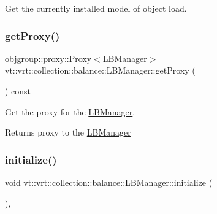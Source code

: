 Get the currently installed model of object load. 

\mbox{\label{structvt_1_1vrt_1_1collection_1_1balance_1_1_l_b_manager_aa0fbba6d90873e5fa6e40767efcabb5c}} 
\subsubsection{\texorpdfstring{get\+Proxy()}{getProxy()}}
{\footnotesize\ttfamily \hyperlink{structvt_1_1objgroup_1_1proxy_1_1_proxy}{objgroup\+::proxy\+::\+Proxy}$<$\hyperlink{structvt_1_1vrt_1_1collection_1_1balance_1_1_l_b_manager}{L\+B\+Manager}$>$ vt\+::vrt\+::collection\+::balance\+::\+L\+B\+Manager\+::get\+Proxy (\begin{DoxyParamCaption}{ }\end{DoxyParamCaption}) const\hspace{0.3cm}{\ttfamily [inline]}}



Get the proxy for the \hyperlink{structvt_1_1vrt_1_1collection_1_1balance_1_1_l_b_manager}{L\+B\+Manager}. 

\begin{DoxyReturn}{Returns}
proxy to the {\ttfamily \hyperlink{structvt_1_1vrt_1_1collection_1_1balance_1_1_l_b_manager}{L\+B\+Manager}} 
\end{DoxyReturn}
\mbox{\label{structvt_1_1vrt_1_1collection_1_1balance_1_1_l_b_manager_a9b9c6fb3aef5efb81465cae39ce3bd06}} 
\subsubsection{\texorpdfstring{initialize()}{initialize()}}
{\footnotesize\ttfamily void vt\+::vrt\+::collection\+::balance\+::\+L\+B\+Manager\+::initialize (\begin{DoxyParamCaption}{ }\end{DoxyParamCaption})\hspace{0.3cm}{\ttfamily [override]}, {\ttfamily [virtual]}}



